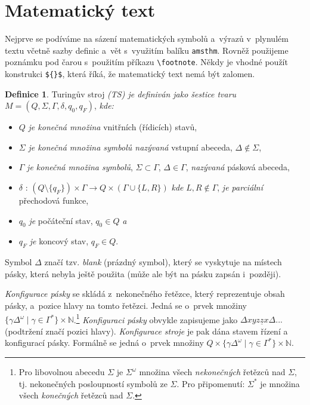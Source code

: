 \documentclass[a4paper, 11 pt, twocolumn]{article}
\theoremstyle{definition}
\newtheorem{theorem}{Definice}
\begin{document}
\section{Matematický text}
Nejprve se podíváme na sázení matematických symbolů
a~výrazů v~plynulém textu včetně sazby definic a~vět s~využitím
balíku \texttt{amsthm}. Rovněž použijeme poznámku pod
čarou s~použitím příkazu \verb|\footnote|. Někdy je vhodné
použít konstrukci \verb|${}$|, která říká, že matematický text
nemá být zalomen.
\begin{theorem}\label{veta_1}
Turingův stroj \emph{(TS) je definiván jako šestice tvaru}
$M=(Q,\Sigma,\Gamma,\delta,q_0,q_F)$, \emph{kde:}

\begin{itemize}
\item $Q$ \emph{je konečná množina} vnitřních (řídicích) stavů,
\item $\Sigma$ \emph{je konečná množina symbolů nazývaná} vstupní
abeceda, $\Delta \not\in \Sigma$,
\item $\Gamma$ \emph{je konečná množina symbolů}, $\Sigma \subset \Gamma $, $\Delta \in \Gamma$, \emph{nazývaná} pásková abeceda,
\item $\delta$ : $(Q \setminus\{q_F\})\times\Gamma \rightarrow Q\times(\Gamma\cup\{L,R\})$ \emph{kde} $L,R \not\in\Gamma$, \emph{je parciální} přechodová funkce,
\item $q_0$ \emph{je} počáteční stav, $q_0 \in Q$ \emph{a}
\item $q_F$ \emph{je} koncový stav, $q_F \in Q$.
\end{itemize}

Symbol $\Delta$ značí tzv. \emph{blank} (prázdný symbol), který
se vyskytuje na místech pásky, která nebyla ještě použita
(může ale být na pásku zapsán i~později).

\emph{Konfigurace pásky} se skládá z~nekonečného řetězce,
který reprezentuje obsah pásky, a~pozice hlavy na tomto
řetězci. Jedná se o~prvek množiny $\{\gamma\Delta^\omega \mid \gamma\in\Gamma^*\}\times \mathbb{N}$.\footnote{Pro libovolnou abecedu $\Sigma$ je $\Sigma^\omega$ množina všech \emph{nekonečných} řetězců nad $\Sigma$, tj. nekonečných posloupností symbolů ze $\Sigma$. Pro připomenutí: $\Sigma^*$ je množina všech \emph{konečných} řetězců nad $\Sigma$.} \emph{Konfiguraci pásky} obvykle zapisujeme jako $\Delta xyz\underline{z}x\Delta...$
(podtržení značí pozici hlavy). \emph{Konfigurace stroje} je pak
dána stavem řízení a konfigurací pásky. Formálně se jedná
o~prvek množiny $Q\times\{\gamma\Delta^\omega\mid\gamma\in\Gamma^*\}\times\mathbb{N}$.
\end{theorem}
\end{document}

